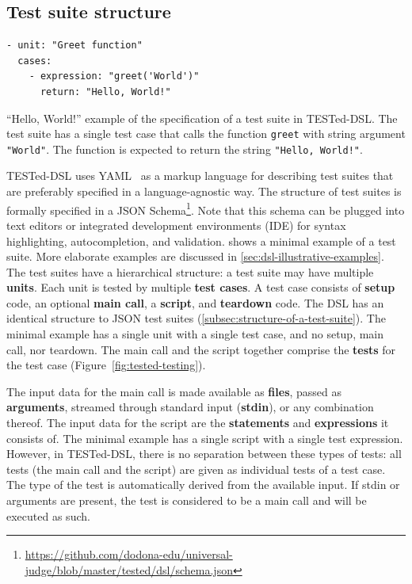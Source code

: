 \documentclass[../main]{subfiles}
\begin{document}
\subsection{Test suite structure}\label{subsec:dsl-test-suite-structure}

\begin{listing}
    \begin{verbatim}
- unit: "Greet function"
  cases:
    - expression: "greet('World')"
      return: "Hello, World!"
    \end{verbatim}
    \caption[]{
        ``Hello, World!'' example of the specification of a test suite in TESTed-DSL.
        The test suite has a single test case that calls the function \texttt{greet} with string argument \texttt{"World"}.
        The function is expected to return the string \texttt{"Hello, World!"}.
    }
    \label{lst:yaml-basic-example}
\end{listing}

TESTed-DSL uses YAML~\autocite{ben-kikiYAMLAinMarkup2021} as a markup language for describing test suites that are preferably specified in a language-agnostic way.
The structure of test suites is formally specified in a JSON Schema\footnote{\url{https://github.com/dodona-edu/universal-judge/blob/master/tested/dsl/schema.json}}.
Note that this schema can be plugged into text editors or integrated development environments (IDE) for syntax highlighting, autocompletion, and validation.
 shows a minimal example of a test suite.
More elaborate examples are discussed in \vref{sec:dsl-illustrative-examples}.
The test suites have a hierarchical structure: a test suite may have multiple \textbf{units}.
Each unit is tested by multiple \textbf{test cases}.
A test case consists of \textbf{setup} code, an optional \textbf{main call}, a \textbf{script}, and \textbf{teardown} code.
The DSL has an identical structure to JSON test suites (\vref{subsec:structure-of-a-test-suite}).
The minimal example has a single unit with a single test case, and no setup, main call, nor teardown.
The main call and the script together comprise the \textbf{tests} for the test case (Figure~\ref{fig:tested-testing}).

The input data for the main call is made available as \textbf{files}, passed as \textbf{arguments}, streamed through standard input (\textbf{stdin}), or any combination thereof.
The input data for the script are the \textbf{statements} and \textbf{expressions} it consists of.
The minimal example has a single script with a single test expression.
However, in TESTed-DSL, there is no separation between these types of tests: all tests (the main call and the script) are given as individual tests of a test case.
The type of the test is automatically derived from the available input.
If stdin or arguments are present, the test is considered to be a main call and will be executed as such.
\end{document}
